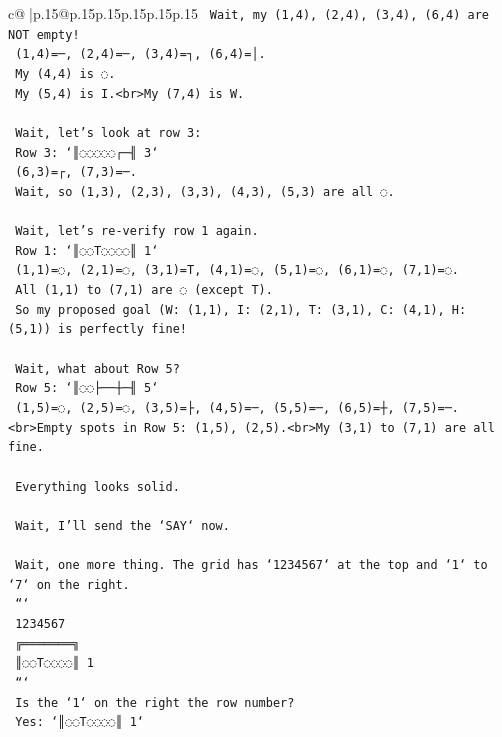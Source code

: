 \documentclass{article}
\begin{document}
{\begin{supertabular}{c@{$\;$}|p{.15\linewidth}@{}p{.15\linewidth}p{.15\linewidth}p{.15\linewidth}p{.15\linewidth}p{.15\linewidth}}
{{{\texttt{    Wait, my (1,4), (2,4), (3,4), (6,4) are NOT empty!} \\
\texttt{    (1,4)=─, (2,4)=─, (3,4)=┐, (6,4)=│.} \\
\texttt{    My (4,4) is ◌.} \\
\texttt{    My (5,4) is I.<br>My (7,4) is W.} \\
\\ 
\texttt{    Wait, let's look at row 3:} \\
\texttt{    Row 3: `║◌◌◌◌◌┌─╢ 3`} \\
\texttt{    (6,3)=┌, (7,3)=─.} \\
\texttt{    Wait, so (1,3), (2,3), (3,3), (4,3), (5,3) are all ◌.} \\
\\ 
\texttt{    Wait, let's re{-}verify row 1 again.} \\
\texttt{    Row 1: `║◌◌T◌◌◌◌║ 1`} \\
\texttt{    (1,1)=◌, (2,1)=◌, (3,1)=T, (4,1)=◌, (5,1)=◌, (6,1)=◌, (7,1)=◌.} \\
\texttt{    All (1,1) to (7,1) are ◌ (except T).} \\
\texttt{    So my proposed goal (W: (1,1), I: (2,1), T: (3,1), C: (4,1), H: (5,1)) is perfectly fine!} \\
\\ 
\texttt{    Wait, what about Row 5?} \\
\texttt{    Row 5: `║◌◌├──┼─╢ 5`} \\
\texttt{    (1,5)=◌, (2,5)=◌, (3,5)=├, (4,5)=─, (5,5)=─, (6,5)=┼, (7,5)=─.<br>Empty spots in Row 5: (1,5), (2,5).<br>My (3,1) to (7,1) are all fine.} \\
\\ 
\texttt{    Everything looks solid.} \\
\\ 
\texttt{    Wait, I'll send the `SAY` now.} \\
\\ 
\texttt{    Wait, one more thing. The grid has `1234567` at the top and `1` to `7` on the right.} \\
\texttt{    ```} \\
\texttt{     1234567} \\
\texttt{    ╔═══════╗} \\
\texttt{    ║◌◌T◌◌◌◌║ 1} \\
\texttt{    ```} \\
\texttt{    Is the `1` on the right the row number?} \\
\texttt{    Yes: `║◌◌T◌◌◌◌║ 1`} \\
}}}
\end{supertabular}}
\end{document}

